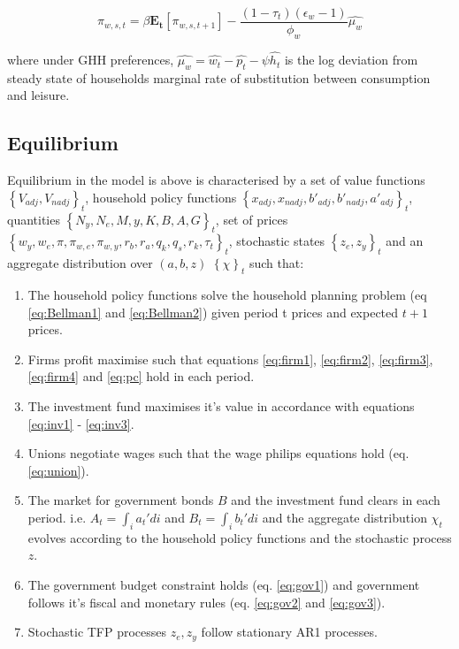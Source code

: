 \documentclass[12pt]{article}
\begin{document}
\begin{equation}
    \pi_{w,s,t}=\beta \mathbf{E_{t}}[\pi_{w,s,t+1}] - \frac{(1-\tau_{t})(\epsilon_{w}-1)}{\phi_{w}}\hat{\mu_{w}}
\end{equation}

where under GHH preferences,  $\hat{\mu_{w}}=\hat{w_{t}}  - \hat{p_{t}} -\psi \hat{h_t}$ is the log deviation from steady state of households marginal rate of substitution between consumption and leisure. 

\subsection{Equilibrium}

Equilibrium in the model is above is characterised by a set of value functions $\left\{V_{adj},V_{nadj} \right\}_{t}$, household policy functions $\left\{x_{adj},x_{nadj},b'_{adj},b'_{nadj},a'_{adj}  \right\}_{t}$,  quantities $\left\{N_{y},N_{e},M,y,K,B,A,G\right\}_{t}$, set of prices $\left\{w_{y},w_{e},\pi,\pi_{w,e},\pi_{w,y},r_{b},r_{a},q_{k},q_{s},r_{k},\tau_{t} \right\}_{t}$, stochastic states $\left\{z_{e},z_{y} \right\}_{t}$ and an aggregate distribution over $(a,b,z)$ $\left\{\chi \right\}_{t}$ such that:

\begin{enumerate}
    \item The household policy functions solve the household planning  problem (eq \ref{eq:Bellman1} and \ref{eq:Bellman2}) given period t prices and expected $t+1$ prices.
    \item Firms profit maximise such that equations \ref{eq:firm1}, \ref{eq:firm2}, \ref{eq:firm3}, \ref{eq:firm4} and \ref{eq:pc} hold in each period. 
    \item The investment fund maximises it's value in accordance with equations \ref{eq:inv1} - \ref{eq:inv3}. 
    \item Unions negotiate wages such that the wage philips equations hold (eq. \ref{eq:union}). 
    \item The market for government bonds $B$ and the investment fund clears in each period. i.e. $A_{t}=\int_{i}a_{t}'di$ and $B_{t}=\int_{i}b_{t}'di$ and the aggregate distribution $\chi_{t}$ evolves according to the household policy functions and the stochastic process $z$. 
    \item The government budget constraint holds (eq. \ref{eq:gov1}) and government follows it's fiscal and monetary rules (eq. \ref{eq:gov2} and \ref{eq:gov3}). 
    \item Stochastic TFP processes $z_{e},z_{y}$ follow stationary AR1 processes. 
\end{enumerate}
\end{document}
